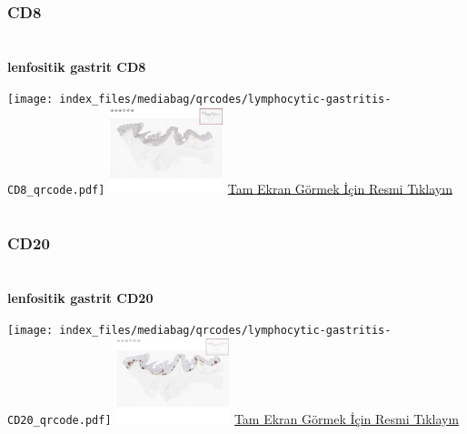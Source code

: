 \documentclass[
  letterpaper,
  DIV=11,
  numbers=noendperiod]{scrreprt}
\begin{document}
\hypertarget{section-15}{%
\chapter{}\label{section-15}}

\hypertarget{cd8}{%
\subsection{CD8}\label{cd8}}

\hypertarget{section-16}{%
\chapter{}\label{section-16}}

\textbf{lenfositik gastrit CD8}

\texttt{[image: index\_files/mediabag/qrcodes/lymphocytic-gastritis-CD8\_qrcode.pdf]}
\href{https://images.patolojiatlasi.com/lymphocytic-gastritis/CD8.html}{\includegraphics[width=0.25\textwidth,height=\textheight]{./screenshots/thumbnail_lymphocytic-gastritisCD8.png}}
\href{https://images.patolojiatlasi.com/lymphocytic-gastritis/CD8.html}{Tam
Ekran Görmek İçin Resmi Tıklayın}

\hypertarget{section-17}{%
\chapter{}\label{section-17}}

\hypertarget{cd20}{%
\subsection{CD20}\label{cd20}}

\hypertarget{section-18}{%
\chapter{}\label{section-18}}

\textbf{lenfositik gastrit CD20}

\texttt{[image: index\_files/mediabag/qrcodes/lymphocytic-gastritis-CD20\_qrcode.pdf]}
\href{https://images.patolojiatlasi.com/lymphocytic-gastritis/CD20.html}{\includegraphics[width=0.25\textwidth,height=\textheight]{./screenshots/thumbnail_lymphocytic-gastritisCD20.png}}
\href{https://images.patolojiatlasi.com/lymphocytic-gastritis/CD20.html}{Tam
Ekran Görmek İçin Resmi Tıklayın}
\end{document}
